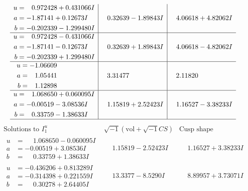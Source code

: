 \documentclass[1p]{elsarticle_modified}
\theoremstyle{definition}
\newcommand{\I}{\sqrt{-1}}
\begin{document}
$$\begin{array}{c|c|c}
\begin{aligned}
u &= \phantom{-}0.972428 + 0.431066 I \\
a &= -1.87141 + 0.12673 I \\
b &= -0.202339 - 1.299480 I\end{aligned}
 & \phantom{-}0.32639 - 1.89843 I & \phantom{-}4.06618 + 4.82062 I \\ \hline\begin{aligned}
u &= \phantom{-}0.972428 - 0.431066 I \\
a &= -1.87141 - 0.12673 I \\
b &= -0.202339 + 1.299480 I\end{aligned}
 & \phantom{-}0.32639 + 1.89843 I & \phantom{-}4.06618 - 4.82062 I \\ \hline\begin{aligned}
u &= -1.06609\phantom{ +0.000000I} \\
a &= \phantom{-}1.05441\phantom{ +0.000000I} \\
b &= \phantom{-}1.12898\phantom{ +0.000000I}\end{aligned}
 & \phantom{-}3.31477\phantom{ +0.000000I} & \phantom{-}2.11820\phantom{ +0.000000I} \\ \hline\begin{aligned}
u &= \phantom{-}1.068650 + 0.060095 I \\
a &= -0.00519 - 3.08536 I \\
b &= \phantom{-}0.33759 - 1.38633 I\end{aligned}
 & \phantom{-}1.15819 + 2.52423 I & \phantom{-}1.16527 - 3.38233 I\\
 \hline 
 \end{array}$$\newpage$$\begin{array}{c|c|c}  
\text{Solutions to }I^u_{1}& \I (\text{vol} + \sqrt{-1}CS) & \text{Cusp shape}\\
 \hline 
\begin{aligned}
u &= \phantom{-}1.068650 - 0.060095 I \\
a &= -0.00519 + 3.08536 I \\
b &= \phantom{-}0.33759 + 1.38633 I\end{aligned}
 & \phantom{-}1.15819 - 2.52423 I & \phantom{-}1.16527 + 3.38233 I \\ \hline\begin{aligned}
u &= -0.436206 + 0.813289 I \\
a &= -0.314398 + 0.221559 I \\
b &= \phantom{-}0.30278 + 2.64405 I\end{aligned}
 & \phantom{-}13.3377 - 8.5290 I & \phantom{-}8.89957 + 3.73071 I \\ \hline\begin{aligned}

\end{aligned}
\end{array}$$
\end{document}
